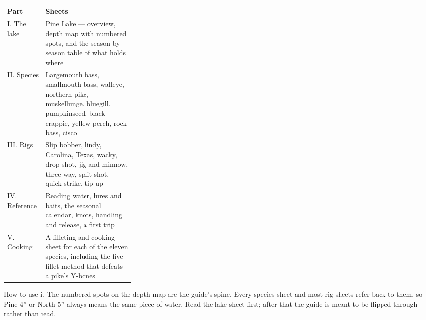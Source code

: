 \begin{tabularx}{\linewidth}{@{}p{0.30\linewidth}L@{}}
\toprule
\textbf{Part} & \textbf{Sheets}\\
\midrule
I. The lake & Pine Lake --- overview, depth map with numbered spots, and the
  season-by-season table of what holds where\\
II. Species & Largemouth bass, smallmouth bass, walleye, northern pike,
  muskellunge, bluegill, pumpkinseed, black crappie, yellow perch, rock bass,
  cisco\\
III. Rigs & Slip bobber, lindy, Carolina, Texas, wacky, drop shot,
  jig-and-minnow, three-way, split shot, quick-strike, tip-up\\
IV. Reference & Reading water, lures and baits, the seasonal calendar,
  knots, handling and release, a first trip\\
V. Cooking & A filleting and cooking sheet for each of the eleven species,
  including the five-fillet method that defeats a pike's Y-bones\\
\bottomrule
\end{tabularx}

\vspace{1.2em}
\begin{telospanel}{How to use it}
The numbered spots on the depth map are the guide's spine. Every species sheet
and most rig sheets refer back to them, so Pine 4'' or North 5'' always
means the same piece of water. Read the lake sheet first; after that the guide
is meant to be flipped through rather than read.
\end{telospanel}




